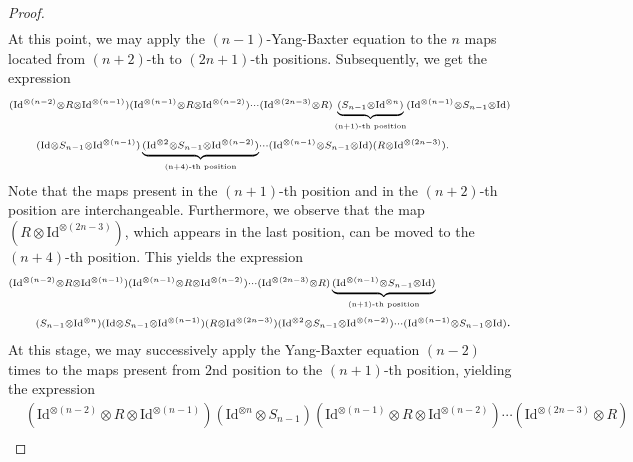 \documentclass[a4paper,reqno,10pt]{amsart}
\theoremstyle{plain}
\theoremstyle{definition}
\theoremstyle{remark}
\begin{document}
\begin{proof}
\begin{align*}
\end{align*}
At this point, we may apply the $(n-1)$-Yang-Baxter equation to the $n$ maps located from $(n+2)$-th to $(2n+1)$-th positions. Subsequently, we get the expression 
\begin{align*}
    & {\scriptstyle (\mathrm{Id}^{\otimes(n-2)}\otimes R\otimes \mathrm{Id}^{\otimes(n-1)})(\mathrm{Id}^{\otimes(n-1)}\otimes R\otimes \mathrm{Id}^{\otimes(n-2)})\cdots(\mathrm{Id}^{\otimes (2n-3)}\otimes R)\underbrace{ {\scriptstyle (S_{n-1}\otimes \mathrm{Id}^{\otimes n}) } }_{\mbox{\tiny(n+1)-\text{\tiny th position}}} (\mathrm{Id}^{\otimes(n-1)}\otimes S_{n-1}\otimes \mathrm{Id}) } \\
    & \qquad {\scriptstyle (\mathrm{Id}\otimes S_{n-1}\otimes \mathrm{Id}^{\otimes(n-1)})\underbrace{   {\scriptstyle (\mathrm{Id}^{\otimes 2}\otimes S_{n-1}\otimes \mathrm{Id}^{\otimes(n-2)}) } }_{\mbox{\tiny(n+4)-\text{\tiny th position}}}\cdots(\mathrm{Id}^{\otimes(n-1)}\otimes S_{n-1}\otimes\mathrm{Id}) (R\otimes \mathrm{Id}^{\otimes(2n-3)}).}
\end{align*}
Note that the maps present in the $(n+1)$-th position and in the $(n+2)$-th position are interchangeable. Furthermore, we observe that the map $(R\otimes \mathrm{Id}^{\otimes(2n-3)})$, which appears in the last position, can be moved to the $(n+4)$-th position. This yields the expression 
\begin{align*}
    & {\scriptstyle  (\mathrm{Id}^{\otimes(n-2)}\otimes R\otimes \mathrm{Id}^{\otimes(n-1)})(\mathrm{Id}^{\otimes(n-1)}\otimes R\otimes \mathrm{Id}^{\otimes(n-2)})\cdots(\mathrm{Id}^{\otimes (2n-3)}\otimes R)\underbrace{ {\scriptstyle  (\mathrm{Id}^{\otimes(n-1)}\otimes S_{n-1}\otimes \mathrm{Id}) }  }_{\mbox{\tiny(n+1)-\text{\tiny th position}}}  }   \\
    & \qquad {\scriptstyle (S_{n-1}\otimes \mathrm{Id}^{\otimes n})(\mathrm{Id}\otimes S_{n-1}\otimes \mathrm{Id}^{\otimes(n-1)})(R\otimes \mathrm{Id}^{\otimes(2n-3)})(\mathrm{Id}^{\otimes 2}\otimes S_{n-1}\otimes \mathrm{Id}^{\otimes(n-2)})\cdots(\mathrm{Id}^{\otimes(n-1)}\otimes S_{n-1}\otimes \mathrm{Id})}.
\end{align*}
At this stage, we may successively apply the Yang-Baxter equation $(n-2)$ times to the maps present from $2$nd position to the $(n+1)$-th position, yielding the expression
\begin{align*}
    & {\scriptstyle (\mathrm{Id}^{\otimes(n-2)}\otimes R\otimes \mathrm{Id}^{\otimes(n-1)})(\mathrm{Id}^{\otimes n}\otimes S_{n-1})(\mathrm{Id}^{\otimes(n-1)}\otimes R\otimes \mathrm{Id}^{\otimes(n-2)})\cdots(\mathrm{Id}^{\otimes (2n-3)}\otimes R)  } \\

\end{align*}
\end{proof}
\end{document}
